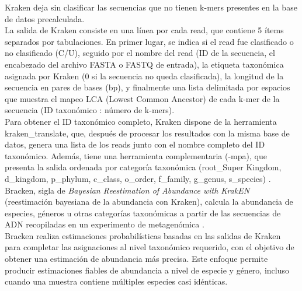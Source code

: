 Kraken deja sin clasificar las secuencias que no tienen k-mers presentes en la base de datos precalculada.\\

La salida de Kraken consiste en una línea por cada read, que contiene 5 ítems separados por tabulaciones. 
En primer lugar, se indica si el read fue clasificado o no clasificado (C/U), seguido por el nombre del read 
(ID de la secuencia, el encabezado del archivo FASTA o FASTQ de entrada), la etiqueta taxonómica asignada por Kraken 
(0 si la secuencia no queda clasificada), la longitud de la secuencia en pares de bases (bp), y finalmente una lista 
delimitada por espacios que muestra el mapeo LCA (Lowest Common Ancestor) de cada k-mer de la secuencia 
(ID taxonómico : número de k-mers).\\

Para obtener el ID taxonómico completo, Kraken dispone de la herramienta kraken\_translate, que, después de procesar 
los resultados con la misma base de datos, genera una lista de los reads junto con el nombre completo del ID taxonómico. 
Además, tiene una herramienta complementaria (-mpa), que presenta la salida ordenada por categoría taxonómica 
(root\_Super Kingdom, d\_kingdom, p\_phylum, c\_class, o\_order, f\_family, g\_genus, s\_species) 
\citep{wood2014kraken, lu2022metagenome}.\\



Bracken, sigla de \emph{Bayesian Reestimation of Abundance with KrakEN} (reestimación bayesiana de la abundancia con
Kraken), calcula la abundancia de especies, 
géneros u otras categorías taxonómicas a partir de las secuencias de ADN recopiladas en un experimento de metagenómica 
\citep{lu2017bracken}.\\

Bracken realiza estimaciones probabilísticas basadas en las salidas de Kraken para completar las asignaciones 
al nivel taxonómico requerido, con el objetivo de obtener una estimación de abundancia más precisa. 
Este enfoque permite producir estimaciones fiables de abundancia a nivel de especie y género, incluso cuando una muestra 
contiene múltiples especies casi idénticas.



